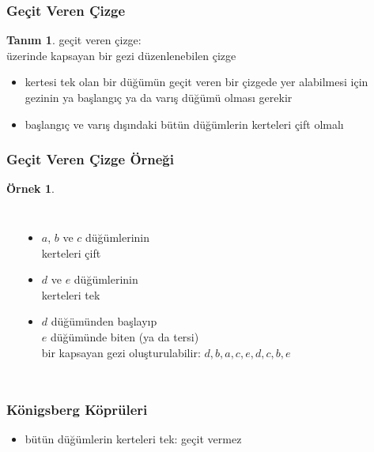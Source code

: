 \documentclass[dvipsnames]{beamer}
\theoremstyle{definition}
\newtheorem{tanim}[theorem]{Tanım}
\theoremstyle{example}
\newtheorem{ornek}[theorem]{Örnek}
\theoremstyle{plain}
\begin{document}
\begin{frame}
  \frametitle{Geçit Veren Çizge}

  \begin{tanim}
    \alert{geçit veren çizge}:\\
    üzerinde kapsayan bir gezi düzenlenebilen çizge
  \end{tanim}

  \begin{itemize}
    \pause
    \item kertesi tek olan bir düğümün geçit veren bir çizgede yer alabilmesi
      için gezinin ya başlangıç ya da varış düğümü olması gerekir

    \pause
    \item başlangıç ve varış dışındaki bütün düğümlerin kerteleri çift olmalı
  \end{itemize}
\end{frame}

\begin{frame}
  \frametitle{Geçit Veren Çizge Örneği}

  \begin{ornek}
    \begin{columns}
      \begin{center}
      \end{center}

      \pause
      \begin{itemize}
        \item $a$, $b$ ve $c$ düğümlerinin\\
          kerteleri çift
        \item $d$ ve $e$ düğümlerinin\\
          kerteleri tek
        \pause
        \item $d$ düğümünden başlayıp\\
          $e$ düğümünde biten (ya da tersi)\\
          bir kapsayan gezi oluşturulabilir: $d,b,a,c,e,d,c,b,e$
      \end{itemize}
    \end{columns}
  \end{ornek}
\end{frame}

\begin{frame}
  \frametitle{Königsberg Köprüleri}

  \begin{center}
  \end{center}

  \pause
  \begin{itemize}
    \item bütün düğümlerin kerteleri tek: geçit vermez
  \end{itemize}
\end{frame}
\end{document}
